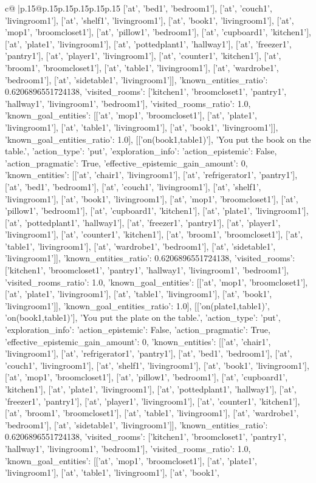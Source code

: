 \documentclass{article}
\begin{document}
{\begin{supertabular}{c@{$\;$}|p{.15\linewidth}@{}p{.15\linewidth}p{.15\linewidth}p{.15\linewidth}p{.15\linewidth}p{.15\linewidth}}
{{{['at', 'bed1', 'bedroom1'], ['at', 'couch1', 'livingroom1'], ['at', 'shelf1', 'livingroom1'], ['at', 'book1', 'livingroom1'], ['at', 'mop1', 'broomcloset1'], ['at', 'pillow1', 'bedroom1'], ['at', 'cupboard1', 'kitchen1'], ['at', 'plate1', 'livingroom1'], ['at', 'pottedplant1', 'hallway1'], ['at', 'freezer1', 'pantry1'], ['at', 'player1', 'livingroom1'], ['at', 'counter1', 'kitchen1'], ['at', 'broom1', 'broomcloset1'], ['at', 'table1', 'livingroom1'], ['at', 'wardrobe1', 'bedroom1'], ['at', 'sidetable1', 'livingroom1']], 'known_entities_ratio': 0.6206896551724138, 'visited_rooms': ['kitchen1', 'broomcloset1', 'pantry1', 'hallway1', 'livingroom1', 'bedroom1'], 'visited_rooms_ratio': 1.0, 'known_goal_entities': [['at', 'mop1', 'broomcloset1'], ['at', 'plate1', 'livingroom1'], ['at', 'table1', 'livingroom1'], ['at', 'book1', 'livingroom1']], 'known_goal_entities_ratio': 1.0}}], [['on(book1,table1)'], 'You put the book on the table.', {'action_type': 'put', 'exploration_info': {'action_epistemic': False, 'action_pragmatic': True, 'effective_epistemic_gain_amount': 0, 'known_entities': [['at', 'chair1', 'livingroom1'], ['at', 'refrigerator1', 'pantry1'], ['at', 'bed1', 'bedroom1'], ['at', 'couch1', 'livingroom1'], ['at', 'shelf1', 'livingroom1'], ['at', 'book1', 'livingroom1'], ['at', 'mop1', 'broomcloset1'], ['at', 'pillow1', 'bedroom1'], ['at', 'cupboard1', 'kitchen1'], ['at', 'plate1', 'livingroom1'], ['at', 'pottedplant1', 'hallway1'], ['at', 'freezer1', 'pantry1'], ['at', 'player1', 'livingroom1'], ['at', 'counter1', 'kitchen1'], ['at', 'broom1', 'broomcloset1'], ['at', 'table1', 'livingroom1'], ['at', 'wardrobe1', 'bedroom1'], ['at', 'sidetable1', 'livingroom1']], 'known_entities_ratio': 0.6206896551724138, 'visited_rooms': ['kitchen1', 'broomcloset1', 'pantry1', 'hallway1', 'livingroom1', 'bedroom1'], 'visited_rooms_ratio': 1.0, 'known_goal_entities': [['at', 'mop1', 'broomcloset1'], ['at', 'plate1', 'livingroom1'], ['at', 'table1', 'livingroom1'], ['at', 'book1', 'livingroom1']], 'known_goal_entities_ratio': 1.0}}], [['on(plate1,table1)', 'on(book1,table1)'], 'You put the plate on the table.', {'action_type': 'put', 'exploration_info': {'action_epistemic': False, 'action_pragmatic': True, 'effective_epistemic_gain_amount': 0, 'known_entities': [['at', 'chair1', 'livingroom1'], ['at', 'refrigerator1', 'pantry1'], ['at', 'bed1', 'bedroom1'], ['at', 'couch1', 'livingroom1'], ['at', 'shelf1', 'livingroom1'], ['at', 'book1', 'livingroom1'], ['at', 'mop1', 'broomcloset1'], ['at', 'pillow1', 'bedroom1'], ['at', 'cupboard1', 'kitchen1'], ['at', 'plate1', 'livingroom1'], ['at', 'pottedplant1', 'hallway1'], ['at', 'freezer1', 'pantry1'], ['at', 'player1', 'livingroom1'], ['at', 'counter1', 'kitchen1'], ['at', 'broom1', 'broomcloset1'], ['at', 'table1', 'livingroom1'], ['at', 'wardrobe1', 'bedroom1'], ['at', 'sidetable1', 'livingroom1']], 'known_entities_ratio': 0.6206896551724138, 'visited_rooms': ['kitchen1', 'broomcloset1', 'pantry1', 'hallway1', 'livingroom1', 'bedroom1'], 'visited_rooms_ratio': 1.0, 'known_goal_entities': [['at', 'mop1', 'broomcloset1'], ['at', 'plate1', 'livingroom1'], ['at', 'table1', 'livingroom1'], ['at', 'book1', }}}
\end{supertabular}}
\end{document}

